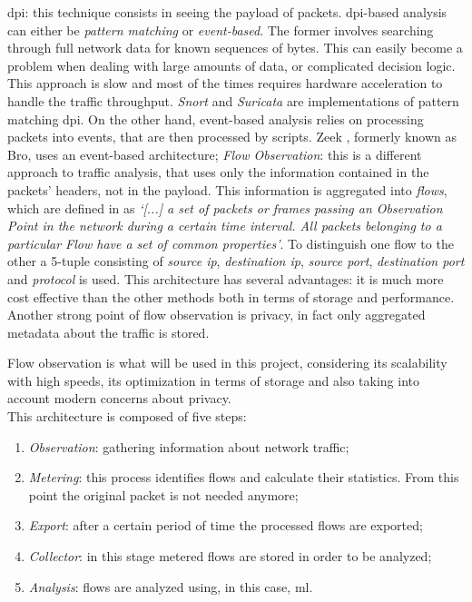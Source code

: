 \begin{itemize}
    \itemAR \gls{dpi}: this technique consists in seeing the payload of  packets. \gls{dpi}-based analysis can either be \textit{pattern matching} or \textit{event-based}. The former involves searching through full network data for known sequences of bytes. This can easily become a problem when dealing with large amounts of data, or complicated decision logic. This approach is slow and most of the times requires  hardware acceleration to handle the traffic throughput. \textit{Snort} \cite{SnortWebsite} and \textit{Suricata} \cite{SuricataWebsite} are implementations of pattern matching \gls{dpi}. On the other hand, event-based analysis relies on processing packets into events, that are then processed by scripts. Zeek \cite{ZeekWebsite}, formerly known as Bro, uses an event-based architecture;
    \itemAR \textit{Flow Observation}: this is a different approach to traffic analysis, that uses only the information contained in the packets' headers, not in the payload. This information is aggregated into \textit{flows}, which are defined in \cite{RFC7011} as \textit{`[...] a set of packets or frames passing an Observation Point in the network during a certain time interval. All packets belonging to a particular Flow have a set of common properties'}. To distinguish one flow to the other a 5-tuple consisting of \textit{source ip}, \textit{destination ip}, \textit{source port}, \textit{destination port} and \textit{protocol} is used. This architecture has several advantages: it is much more cost effective than the other methods both in terms of storage and performance. Another strong point of flow observation is privacy, in fact only aggregated metadata about the traffic is stored.
\end{itemize}

\noindent Flow observation is what will be used in this project, considering its scalability with high speeds, its optimization in terms of storage and also taking into account modern concerns about privacy. \\ This architecture is composed of five steps:

\begin{enumerate}
    \item[\circled{1}] \textit{Observation}: gathering information about network traffic;
    \item[\circled{2}] \textit{Metering}: this process identifies flows and calculate their statistics. From this point the original packet is not needed anymore;
    \item[\circled{3}] \textit{Export}: after a certain period of time the processed flows are exported;
    \item[\circled{4}] \textit{Collector}: in this stage metered flows are stored in order to be analyzed;
    \item[\circled{5}] \textit{Analysis}: flows are analyzed using, in this case, \gls{ml}.
\end{enumerate}

